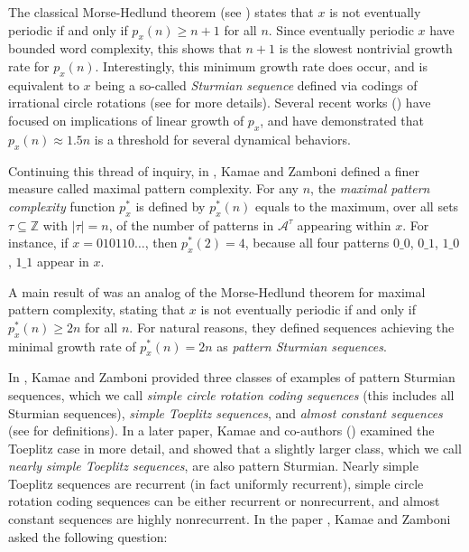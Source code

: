 \documentclass[11pt,reqno]{amsart}
\theoremstyle{definition}
\theoremstyle{plain}
\begin{document}
The classical Morse-Hedlund theorem (see \cite{MorseHedlund}) states that $x$ is not eventually periodic if and only if $p_x(n) \geq n+1$ for all $n$. Since eventually periodic $x$ have bounded word complexity, this shows that $n+1$ is the slowest nontrivial growth rate for $p_x(n)$. Interestingly, this minimum growth rate does occur, and is equivalent to $x$ being a so-called \emph{Sturmian sequence} defined via codings of irrational circle rotations (see  for more details). Several recent works (\cite{CK2,CK1,DDMP1,DDMP2}) have focused on implications of linear growth of $p_x$, and \cite{Creutz_Pavlov-less_than_3/2, Creutz_Pavlov-low_complexity} have demonstrated that $p_x(n) \approx 1.5n$ is a threshold for several dynamical behaviors.

Continuing this thread of inquiry, in \cite{Kamae-Zamboni-sequence_entropy}, Kamae and Zamboni defined a  finer measure called maximal pattern complexity. For any $n$, the \emph{maximal pattern complexity} function $p^*_x$ is defined by $p^*_x(n)$ equals to the maximum, over all sets 
$\tau \subseteq \mathbb{Z}$ with $|\tau| = n$, of the number of patterns in $\mathcal{A}^{\tau}$ appearing within $x$. For instance, if $x = 010110 \ldots$, then $p^*_x(2) = 4$, because all four patterns $0\_0$, $0\_1$, $1\_0$, $1\_1$ appear in $x$.

A main result of \cite{Kamae-Zamboni-sequence_entropy} was an analog of the Morse-Hedlund theorem for maximal pattern complexity, stating that $x$ is not eventually periodic if and only if $p^*_x(n)\geq 2n$ for all $n$. For natural reasons, they defined sequences achieving the minimal growth rate of $p^*_x(n) = 2n$ as \emph{pattern Sturmian sequences}.

In \cite{Kamae-Zamboni-discrete, Kamae-Zamboni-sequence_entropy}, Kamae and Zamboni provided three classes of examples of pattern Sturmian sequences, which we call \emph{simple circle rotation coding sequences} (this includes all Sturmian sequences), \emph{simple Toeplitz sequences}, and \emph{almost constant sequences} (see  for definitions). In a later paper, Kamae and co-authors (\cite{Gjini_Kamae_Bo_Yu-Mei-toeplitz}) examined the Toeplitz case in more detail, and showed that a slightly larger class, which we call \emph{nearly simple Toeplitz sequences}, are also pattern Sturmian. 
Nearly simple Toeplitz sequences are recurrent (in fact uniformly recurrent), simple circle rotation coding sequences can be either recurrent or nonrecurrent, and almost constant sequences are highly nonrecurrent. In the paper \cite{Kamae-Zamboni-sequence_entropy}, Kamae and Zamboni asked the following question:
\end{document}
